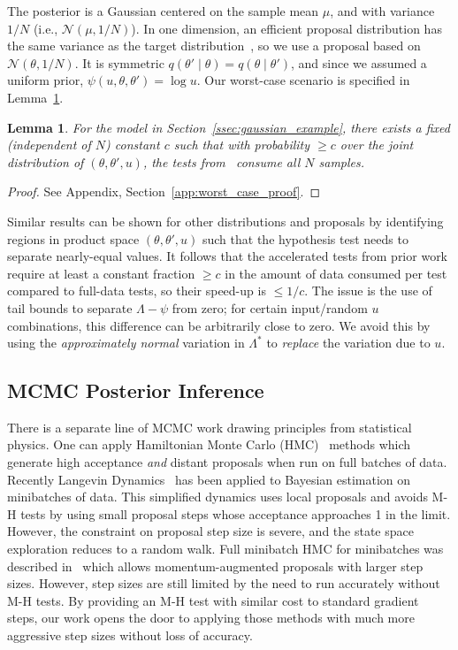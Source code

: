 \documentclass{article}
\newtheorem{lemma}{Lemma}
\begin{document}
The posterior is a Gaussian centered on the sample mean $\mu$, and with variance
$1/N$ (i.e., $\mathcal{N}(\mu, 1/N)$). In one dimension, an efficient proposal
distribution has the same variance as the target
distribution~\cite{OptimalScaling01}, so we use a proposal based on
$\mathcal{N}(\theta,1/N)$. It is symmetric
$q(\theta'\mid\theta)=q(\theta\mid\theta')$, and since we assumed a uniform
prior, $\psi(u,\theta,\theta')=\log u$. Our worst-case scenario is specified in
Lemma~\ref{lem:worst_case}.

\begin{lemma}\label{lem:worst_case}
    For the model in Section~\ref{ssec:gaussian_example}, there exists a fixed
    (independent of $N$) constant $c$ such that with probability $\geq c$ over
    the joint distribution of $(\theta, \theta', u)$, the tests
    from~\cite{cutting_mh_2014,icml2014c1_bardenet14} consume all $N$ samples. 
\end{lemma}
\vspace{-1em}
\begin{proof}
See Appendix, Section~\ref{app:worst_case_proof}.
\end{proof}
Similar results can be shown for other distributions and proposals by
identifying regions in product space $(\theta,\theta',u)$ such that the
hypothesis test needs to separate nearly-equal values.  It follows that the
accelerated tests from prior work require at least a constant fraction $\geq c$
in the amount of data consumed per test compared to full-data tests, so their
speed-up is $\le 1/c$. The issue is the use of tail bounds to separate $\Lambda-\psi$
from zero; for certain input/random $u$ combinations, this difference can be
arbitrarily close to zero. We avoid this by using the {\em approximately normal}
variation in $\Lambda^*$ to {\em replace} the variation due to $u$. 

\subsection{MCMC Posterior Inference}
There is a separate line of MCMC work drawing principles from statistical
physics. One can apply
Hamiltonian Monte Carlo (HMC)~\cite{mcmc_hamiltonian_2010} methods which
generate high acceptance \emph{and} distant proposals when run on full batches
of data. Recently Langevin Dynamics~\cite{langevin_2011,conf/icml/AhnBW12} has
been applied to Bayesian estimation on minibatches of data. This simplified
dynamics uses local proposals and avoids M-H tests by using small proposal steps
whose acceptance approaches 1 in the limit. However, the constraint on proposal
step size is severe, and the state space exploration reduces to a random walk.
Full minibatch HMC for minibatches was described in~\cite{sghmc_2014} which
allows momentum-augmented proposals with larger step sizes. However, step sizes
are still limited by the need to run accurately without M-H tests.  By providing
an M-H test with similar cost to standard gradient steps, our work opens the
door to applying those methods with much more aggressive step sizes without loss
of accuracy. 
\end{document}
